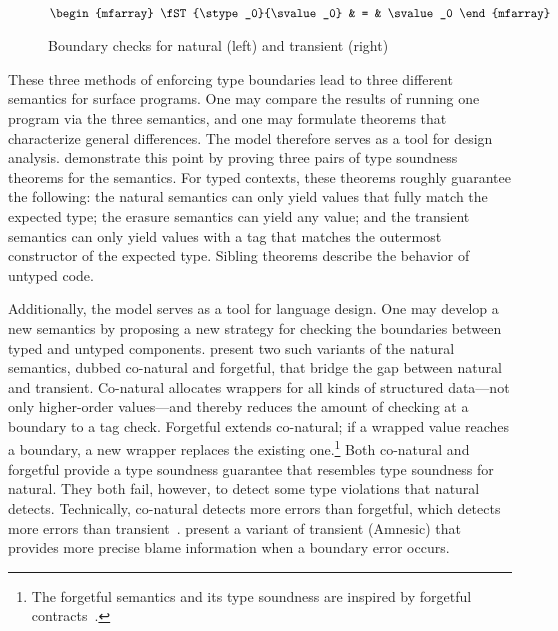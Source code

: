 \begin{figure}[ht]
\begin{minipage}[t]{0.40\columnwidth}
  \fbox{$\STsym : \tpair{\stype}{\svalue} \rightarrow \sexpr$}\\
  \(\begin{mfarray}
    \fST{\stype_0}{\svalue_0}
    & = &
    \svalue_0
  \end{mfarray}\)
  \end{minipage}

  \caption{Boundary checks for natural (left) and transient (right)}
  \label{fig:nt-boundary}
\end{figure}

These three methods of enforcing type boundaries lead to three different
 semantics for surface programs.
One may compare the results of running one program via the three semantics,
 and one may formulate theorems that characterize general differences.
The model therefore serves as a tool for design analysis.
\citet{gf-icfp-2018} demonstrate this point by proving three pairs of type
 soundness theorems for the semantics.
For typed contexts, these theorems roughly guarantee the following:
 the natural semantics can only yield values that fully match the expected type;
 the erasure semantics can yield any value;
 and the transient semantics can only yield values with a tag that matches
 the outermost constructor of the expected type.
Sibling theorems describe the behavior of untyped code.

Additionally, the model serves as a tool for language design.
One may develop a new semantics by proposing a new strategy for checking
 the boundaries between typed and untyped components.
\citet{gf-icfp-2018} present two such variants of the natural semantics,
 dubbed co-natural and forgetful,
 that bridge the gap between natural and transient.
Co-natural allocates wrappers for all kinds of structured data---not only
 higher-order values---and thereby reduces the amount of checking at a boundary
 to a tag check.
Forgetful extends co-natural; if a wrapped value reaches a boundary, a new
 wrapper replaces the existing one.\footnote{The forgetful semantics and its
  type soundness are inspired by forgetful contracts~\cite{g-popl-2015}.}
Both co-natural and forgetful provide a type soundness guarantee that resembles
 type soundness for natural.
They both fail, however, to detect some type violations that natural detects.
Technically, co-natural detects more errors than forgetful, which detects
 more errors than transient~\cite{gf-icfp-2018}.
\citet{gfd-oopsla-2019} present a variant of transient (Amnesic) that
 provides more precise blame information when a boundary error occurs.


